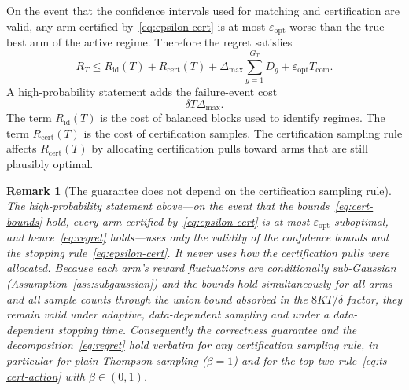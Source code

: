 \documentclass[11pt]{article}
\newtheorem{remark}{Remark}
\begin{document}
On the event that the confidence intervals used for matching and certification are valid, any arm certified by~\eqref{eq:epsilon-cert} is at most $\varepsilon_{\mathrm{opt}}$ worse than the true best arm of the active regime. Therefore the regret satisfies
\begin{equation}
    R_T
    \leq
    R_{\mathrm{id}}(T)
    +
    R_{\mathrm{cert}}(T)
    +
    \Delta_{\max}\sum_{g=1}^{G_T}D_g
    +
    \varepsilon_{\mathrm{opt}}T_{\mathrm{com}}.
    \label{eq:regret}
\end{equation}
A high-probability statement adds the failure-event cost
\begin{equation}
    \delta T\Delta_{\max}.
\end{equation}
The term $R_{\mathrm{id}}(T)$ is the cost of balanced blocks used to identify regimes. The term $R_{\mathrm{cert}}(T)$ is the cost of certification samples. The certification sampling rule affects $R_{\mathrm{cert}}(T)$ by allocating certification pulls toward arms that are still plausibly optimal.

\begin{remark}[The guarantee does not depend on the certification sampling rule]
\label{rem:sampling-free}
The high-probability statement above---on the event that the bounds~\eqref{eq:cert-bounds} hold, every arm certified by~\eqref{eq:epsilon-cert} is at most $\varepsilon_{\mathrm{opt}}$-suboptimal, and hence~\eqref{eq:regret} holds---uses only the validity of the confidence bounds and the stopping rule~\eqref{eq:epsilon-cert}. It never uses how the certification pulls were allocated. Because each arm's reward fluctuations are conditionally sub-Gaussian (Assumption~\ref{ass:subgaussian}) and the bounds hold simultaneously for all arms and all sample counts through the union bound absorbed in the $8KT/\delta$ factor, they remain valid under adaptive, data-dependent sampling and under a data-dependent stopping time. Consequently the correctness guarantee and the decomposition~\eqref{eq:regret} hold verbatim for \emph{any} certification sampling rule, in particular for plain Thompson sampling ($\beta=1$) and for the top-two rule~\eqref{eq:ts-cert-action} with $\beta\in(0,1)$.
\end{remark}
\end{document}
